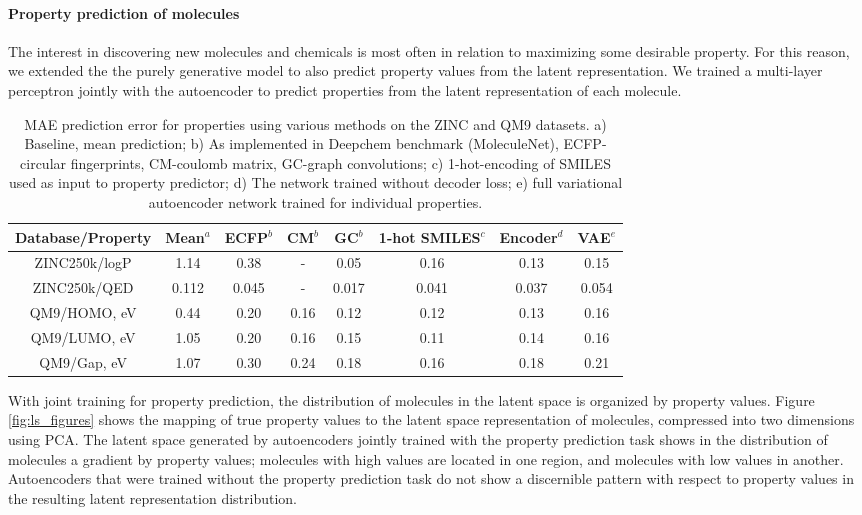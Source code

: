 \documentclass[journal=acscii,manuscript=article]{achemso}
\begin{document}
\paragraph{Property prediction of molecules}
The interest in discovering new molecules and chemicals is most often in relation to maximizing some desirable property. For this reason, we extended the the purely generative model to also predict property values from the latent representation. We trained a multi-layer perceptron jointly with the autoencoder to predict properties from the latent representation of each molecule.

\begin{table}[h]
\centering
\begin{tabular}{|c|c|c|c|c|c|c|c|}
\hline
Database/Property & Mean$^{a}$   & ECFP$^{b}$    & CM$^{b}$ & GC$^{b}$ &  1-hot SMILES$^{c}$ & Encoder$^{d}$ & VAE$^{e}$   \\ 
\hline
ZINC250k/logP & 1.14 & 0.38 & - & 0.05 & 0.16 & 0.13 & 0.15 \\ 
ZINC250k/QED & 0.112 & 0.045 & - & 0.017 & 0.041 & 0.037 & 0.054 \\ 
QM9/HOMO, eV & 0.44 & 0.20 & 0.16 & 0.12 & 0.12 & 0.13 & 0.16  \\ 
QM9/LUMO, eV & 1.05 & 0.20 & 0.16 & 0.15 & 0.11 & 0.14 & 0.16  \\
QM9/Gap, eV & 1.07 & 0.30 & 0.24 & 0.18 & 0.16 & 0.18 & 0.21  \\ 
\hline 
\end{tabular} 
\caption{\small	MAE prediction error for  properties using various methods on the ZINC and QM9 datasets. 
a) Baseline, mean prediction; b) As implemented in Deepchem benchmark (MoleculeNet)\cite{wu2017moleculenet}, ECFP-circular fingerprints, CM-coulomb matrix, GC-graph convolutions; c) 1-hot-encoding of SMILES used as input to property predictor; d) The network trained without decoder loss; e) full variational autoencoder network trained for individual properties.}
\label{tab:props_mae}
\end{table}

With joint training for property prediction, the distribution of molecules in the latent space is organized by property values. Figure \ref{fig:ls_figures} shows the mapping of true property values to the latent space representation of molecules, compressed into two dimensions using PCA. The latent space generated by autoencoders jointly trained with the property prediction task shows in the distribution of molecules a gradient by property values; molecules with high values are located in one region, and molecules with  low values in another. Autoencoders that were trained without the property prediction task do not show a discernible pattern with respect to property values in the resulting latent representation distribution. 
\end{document}
